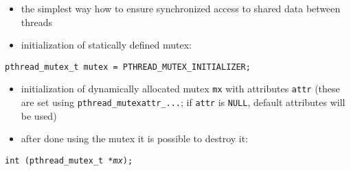 \begin{slide}

\begin{itemize}
\item the simplest way how to ensure synchronized access to shared data between
threads
\item initialization of statically defined mutex:
\end{itemize}

\texttt{pthread\_mutex\_t mutex = PTHREAD\_MUTEX\_INITIALIZER;}

\begin{itemize}
\item initialization of dynamically allocated mutex \texttt{mx} with attributes
\texttt{attr} (these are set using \texttt{pthread\_mutexattr\_...};
if \texttt{attr} is \texttt{NULL}, default attributes will be used)
\end{itemize}


\begin{itemize}
\item after done using the mutex it is possible to destroy it:
\end{itemize}

\texttt{int (pthread\_mutex\_t *\emph{mx});}
\end{slide}

\label{MUTEXES}

